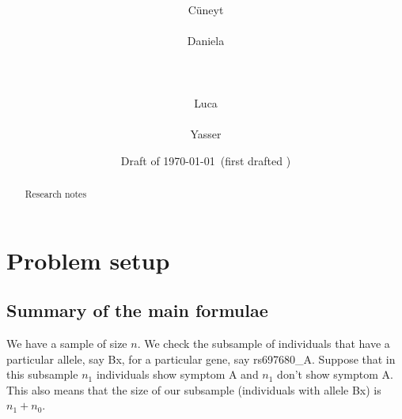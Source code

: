 \documentclass[\ifafour a4paper,12pt,\else a5paper,10pt,\fi%
onecolumn,oneside,article,%
british%
]{memoir}
\title{\propertitle%
}
\author{%
\hspace*{\stretch{1}}%
\parbox{0.5\linewidth}%
{\protect\centering C\"uneyt\\%
\footnotesize\epost{\email{cuneyt.guzey}{ntnu.no}}}%
\hspace*{\stretch{1}}%
\parbox{0.5\linewidth}%
{\protect\centering Daniela\\%
\footnotesize\epost{\email{daniela.bragantini}{ntnu.no}}}%
\hspace*{\stretch{1}}%
\\[\jot]\hspace*{\stretch{1}}%
\parbox{0.5\linewidth}%
{\protect\centering Luca\\%
\footnotesize\epost{\email{piero.mana}{ntnu.no}}}%
\hspace*{\stretch{1}}%
\parbox{0.5\linewidth}%
{\protect\centering Yasser\\%
\footnotesize\epost{\email{yasser.roudi}{ntnu.no}}}%
\hspace*{\stretch{1}}%
}
\date{Draft of \today\ (first drafted \firstdraft)}
\theoremstyle{remark}
\theoremstyle{innote}
\newcommand*{\asudedication}[1]{%
{\par\centering\textit{#1}\par}}
\renewcommand*{\|}{\mathpunct{|}}
\begin{document}
\captiondelim{\quad}\captionnamefont{\footnotesize}\captiontitlefont{\footnotesize}
\frenchspacing

\maketitle
\ifpublic
\abstractrunin
\abslabeldelim{}
\renewcommand*{\abstractname}{}
\setlength{\absleftindent}{0pt}
\setlength{\absrightindent}{0pt}
\setlength{\abstitleskip}{-\absparindent}
\begin{abstract}%
  \noindent Research notes
\end{abstract}\fi

\frenchspacing

\section{Problem setup}
\label{sec:intro}


\subsection{Summary of the main formulae}

We have a sample of size $n$. We check the subsample of individuals that
have a particular allele, say Bx, for a particular gene, say rs697680\_A.
Suppose that in this subsample $n_1$ individuals show symptom A and $n_1$
don't show symptom A. This also means that the size of our subsample
(individuals with allele Bx) is $n_1+n_0$.
\end{document}
